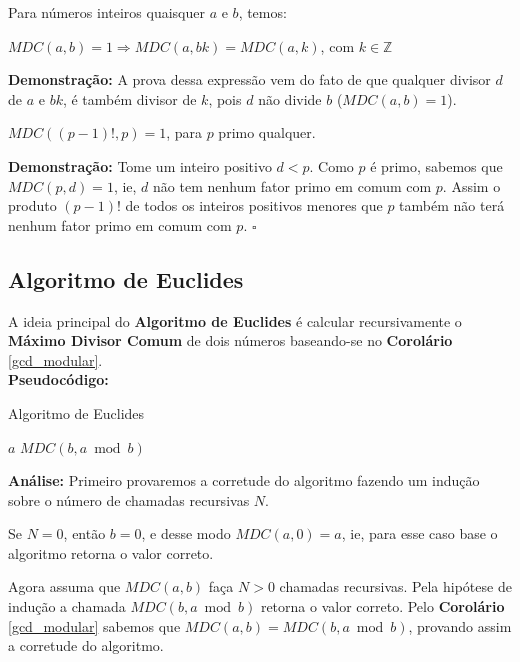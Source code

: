 \begin{proposition}\label{corolario_gcd_produto}
Para números inteiros quaisquer $a$ e $b$, temos:

$MDC(a,b) = 1 \Rightarrow MDC(a,bk) = MDC(a,k)$, com $k \in \mathbb{Z}$
\end{proposition}
\textbf{Demonstração:}
A prova dessa expressão vem do fato de que qualquer divisor $d$ de $a$ e $bk$, é também divisor de $k$, pois $d$ não divide $b$ ($MDC(a,b) = 1$).
\\

\begin{corollary}\label{mdc_primo_fatorial}
$MDC((p-1)!, p)=1$, para $p$ primo qualquer.
\end{corollary}
\textbf{Demonstração:}
Tome um inteiro positivo $d < p$. Como $p$ é primo, sabemos que $MDC(p,d)=1$, ie, $d$ não tem nenhum fator primo em comum com $p$. Assim
o produto $(p-1)!$ de todos os inteiros positivos menores que $p$ também não terá nenhum fator primo em comum com $p$. $\square$
\\



\subsection{Algoritmo de Euclides}\label{algoritmo_de_euclides_subsessao}
A ideia principal do \textbf{Algoritmo de Euclides} é calcular recursivamente o \textbf{Máximo Divisor Comum} de dois números baseando-se no 
\textbf{Corolário} \autoref{gcd_modular}.\\

\textbf{Pseudocódigo:}
\begin{algorithm}
\caption{Algoritmo de Euclides}\label{mdc}
\begin{algorithmic}[1]
\State \Return $a$
\EndIf
\State \Return $MDC(b, a \bmod b)$
\EndProcedure
\end{algorithmic}
\end{algorithm}

\textbf{Análise:}
Primeiro provaremos a corretude do algoritmo fazendo um indução sobre o número de chamadas recursivas $N$.

Se $N=0$, então $b=0$, e desse modo $MDC(a,0)=a$, ie, para esse caso base o algoritmo retorna o valor correto.

Agora assuma que $MDC(a,b)$ faça $N>0$ chamadas recursivas. Pela hipótese de indução a chamada $MDC(b, a \bmod b)$ retorna o valor correto. Pelo \textbf{Corolário} \autoref{gcd_modular} sabemos que $MDC(a,b) = MDC(b, a \bmod b)$, provando assim a corretude do algoritmo.

